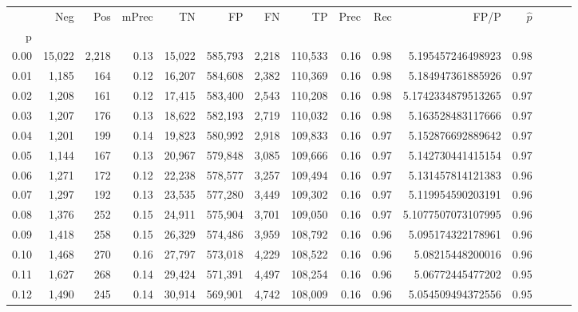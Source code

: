 \begin{tabular}{rrrrrrrrrrrrrrr}
\toprule
{} &     Neg &    Pos & mPrec &       TN &       FP &       FN &       TP &  Prec &   Rec &                  FP/P & $\hat{p}$ \\
p    &         &        &       &          &          &          &          &       &       &                       &           \\
\midrule
0.00 &  15,022 &  2,218 &  0.13 &   15,022 &  585,793 &    2,218 &  110,533 &  0.16 &  0.98 &     5.195457246498923 &      0.98 \\
0.01 &   1,185 &    164 &  0.12 &   16,207 &  584,608 &    2,382 &  110,369 &  0.16 &  0.98 &     5.184947361885926 &      0.97 \\
0.02 &   1,208 &    161 &  0.12 &   17,415 &  583,400 &    2,543 &  110,208 &  0.16 &  0.98 &    5.1742334879513265 &      0.97 \\
0.03 &   1,207 &    176 &  0.13 &   18,622 &  582,193 &    2,719 &  110,032 &  0.16 &  0.98 &     5.163528483117666 &      0.97 \\
0.04 &   1,201 &    199 &  0.14 &   19,823 &  580,992 &    2,918 &  109,833 &  0.16 &  0.97 &     5.152876692889642 &      0.97 \\
0.05 &   1,144 &    167 &  0.13 &   20,967 &  579,848 &    3,085 &  109,666 &  0.16 &  0.97 &     5.142730441415154 &      0.97 \\
0.06 &   1,271 &    172 &  0.12 &   22,238 &  578,577 &    3,257 &  109,494 &  0.16 &  0.97 &     5.131457814121383 &      0.96 \\
0.07 &   1,297 &    192 &  0.13 &   23,535 &  577,280 &    3,449 &  109,302 &  0.16 &  0.97 &     5.119954590203191 &      0.96 \\
0.08 &   1,376 &    252 &  0.15 &   24,911 &  575,904 &    3,701 &  109,050 &  0.16 &  0.97 &    5.1077507073107995 &      0.96 \\
0.09 &   1,418 &    258 &  0.15 &   26,329 &  574,486 &    3,959 &  108,792 &  0.16 &  0.96 &     5.095174322178961 &      0.96 \\
0.10 &   1,468 &    270 &  0.16 &   27,797 &  573,018 &    4,229 &  108,522 &  0.16 &  0.96 &      5.08215448200016 &      0.96 \\
0.11 &   1,627 &    268 &  0.14 &   29,424 &  571,391 &    4,497 &  108,254 &  0.16 &  0.96 &      5.06772445477202 &      0.95 \\
0.12 &   1,490 &    245 &  0.14 &   30,914 &  569,901 &    4,742 &  108,009 &  0.16 &  0.96 &     5.054509494372556 &      0.95 \\

\end{tabular}
